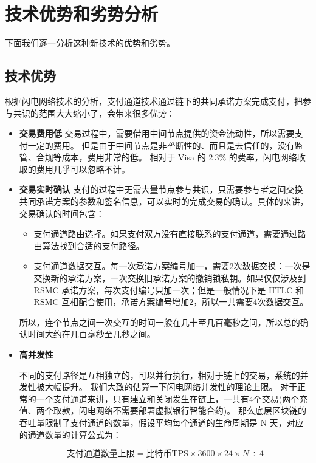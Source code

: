 \section{技术优势和劣势分析}
下面我们逐一分析这种新技术的优势和劣势。

\subsection{技术优势}
根据闪电网络技术的分析，支付通道技术通过链下的共同承诺方案完成支付，把参与共识的范围大大缩小了，会带来很多优势：

\begin{itemize}
    \item  \textbf{交易费用低}
        交易过程中，需要借用中间节点提供的资金流动性，所以需要支付一定的费用。
        但是由于中间节点是非垄断性的、而且是去信任的，没有监管、合规等成本，费用非常的低。
        相对于 Visa 的 $2~3\%$ 的费率，闪电网络收取的费用几乎可以忽略不计。
        
    \item \textbf{交易实时确认}
        支付的过程中无需大量节点参与共识，只需要参与者之间交换共同承诺方案的参数和签名信息，可以实时的完成交易的确认。具体的来讲，交易确认的时间包含：
        \begin{itemize}
            \item 支付通道路由选择。如果支付双方没有直接联系的支付通道，需要通过路由算法找到合适的支付路径。
            \item 支付通道数据交互。每一次承诺方案编号加一，需要2次数据交换：一次是交换新的承诺方案，一次交换旧承诺方案的撤销锁私钥。如果仅仅涉及到 RSMC 承诺方案，每次支付编号只加一次；但是一般情况下是 HTLC 和 RSMC 互相配合使用，承诺方案编号增加2，所以一共需要4次数据交互。
            
        \end{itemize}
        所以，连个节点之间一次交互的时间一般在几十至几百毫秒之间，所以总的确认时间大约在几百毫秒至几秒之间。

      \item \textbf{高并发性}

        不同的支付路径是互相独立的，可以并行执行，相对于链上的交易，系统的并发性被大幅提升。
        我们大致的估算一下闪电网络并发性的理论上限。
        对于正常的一个支付通道来讲，只有建立和关闭发生在链上，一共有4个交易(两个充值、两个取款，闪电网络不需要部署虚拟银行智能合约)。
        那么底层区块链的吞吐量限制了支付通道的数量，假设平均每个通道的生命周期是 N 天，对应的通道数量的计算公式为：

        \begin{equation}
                    \text{支付通道数量上限} = \text{比特币TPS} \times 3600 \times 24 \times N \div 4
        \end{equation}
        

\end{itemize}
